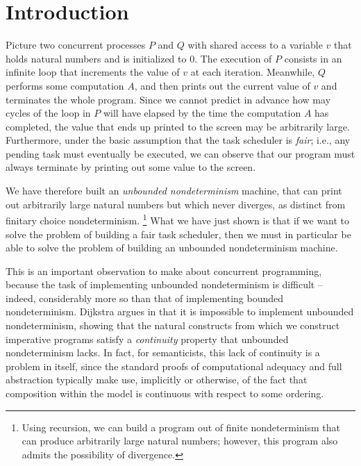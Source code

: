 \documentclass[sigplan,10pt,review]{acmart}\settopmatter{printfolios=true,printccs=false,printacmref=false}
\begin{document}
\maketitle


\section{Introduction}

Picture two concurrent processes $P$ and $Q$ with shared access to a variable $v$ that holds natural numbers and is initialized to $0$.  
The execution of $P$ consists in an infinite loop that increments the value of $v$ at each iteration.  
Meanwhile, $Q$ performs some computation $A$, and then prints out the current value of $v$ and terminates the whole program.
Since we cannot predict in advance how may cycles of the loop in $P$ will have elapsed by the time the computation $A$ has completed, the value that ends up printed to the screen may be arbitrarily large.  
Furthermore, under the basic assumption that the task scheduler is \emph{fair}; i.e., any pending task must eventually be executed, we can observe that our program must always terminate by printing out some value to the screen.  

We have therefore built an \emph{unbounded nondeterminism} machine, that can print out arbitrarily large natural numbers but which never diverges, as distinct from finitary choice nondeterminism.
\footnote{Using recursion, we can build a program out of finite nondeterminism that can produce arbitrarily large natural numbers; however, this program also admits the possibility of divergence.}  
What we have just shown is that if we want to solve the problem of building a fair task scheduler, then we must in particular be able to solve the problem of building an unbounded nondeterminism machine.  

This is an important observation to make about concurrent programming, because the task of implementing unbounded nondeterminism is difficult -- indeed, considerably more so than that of implementing bounded nondeterminism.  
Dijkstra argues in \cite[Ch. 9]{DijkstraBook} that it is impossible to implement unbounded nondeterminism, showing that the natural constructs from which we construct imperative programs satisfy a \emph{continuity} property that unbounded nondeterminism lacks.  
In fact, for semanticists, this lack of continuity is a problem in itself, since the standard proofs of computational adequacy and full abstraction typically make use, implicitly or otherwise, of the fact that composition within the model is continuous with respect to some ordering.
\end{document}
